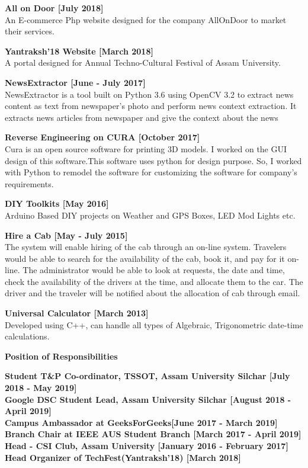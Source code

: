 \documentclass[a4paper,11pt,final]{memoir}
\newcommand{\SmallSep}{\vspace{0.5em}}
\newcommand{\CVSection}[1]
	{\Large\textbf{#1}\par
	\SmallSep\normalsize\normalfont}
\newcommand{\CVItem}[1]
	{\textbf{\color{RoyalBlue} #1}}
\begin{document}
\CVItem{All on Door [July 2018]}\\
An E-commerce Php website designed for the company AllOnDoor to market their services. 
\SmallSep

\CVItem{Yantraksh'18 Website [March 2018] }\\
 A portal designed for Annual Techno-Cultural Festival of Assam University. 
\SmallSep

\CVItem{ NewsExtractor [June - July 2017]}\\
NewsExtractor  is a tool built on Python 3.6 using OpenCV 3.2 to extract news content as text from newspaper’s photo and perform news context extraction. It extracts news articles from newspaper and give the context about the news
\SmallSep

\CVItem{Reverse Engineering on CURA [October 2017]}\\
 Cura is an open source software for printing 3D models. I worked on the GUI design of this software.This software uses python for design purpose. So, I worked with Python to remodel the software for customizing the software for company's requirements. 
\SmallSep

\CVItem{DIY Toolkits [May 2016]}\\
 Arduino Based DIY projects on Weather and GPS Boxes, LED Mod Lights etc.
\SmallSep

\CVItem{Hire a Cab [May - July 2015]}\\
 The system will enable hiring of the cab through an on-line system. Travelers would be able to search for the availability of the cab, book it, and pay for it on-line. The administrator would be able to look at requests, the date and time, check the availability of the drivers at the time, and allocate them to the car. The driver and the traveler will be notified about the allocation of cab through email.
\SmallSep


\CVItem{Universal Calculator  [March 2013]}\\
 Developed using C++, can handle all types of Algebraic, Trigonometric date-time calculations.
\SmallSep

\CVSection{Position of Responsibilities}
\CVItem{Student T\&P Co-ordinator, TSSOT, Assam University Silchar [July 2018 - May 2019]}
\SmallSep \\
 \CVItem{Google DSC Student Lead, Assam University Silchar [August 2018 - April 2019]}
 \SmallSep\\
\CVItem{Campus Ambassador at GeeksForGeeks[June 2017 - March 2019]}
\SmallSep \\
\CVItem{Branch Chair at IEEE AUS Student Branch [March 2017 - April 2019]}
\SmallSep \\
\CVItem{Head - CSI Club, Assam University [January 2016 - February 2017]}
\SmallSep \\
\CVItem{Head Organizer of TechFest(Yantraksh'18) [March 2018]}
\SmallSep
\end{document}
